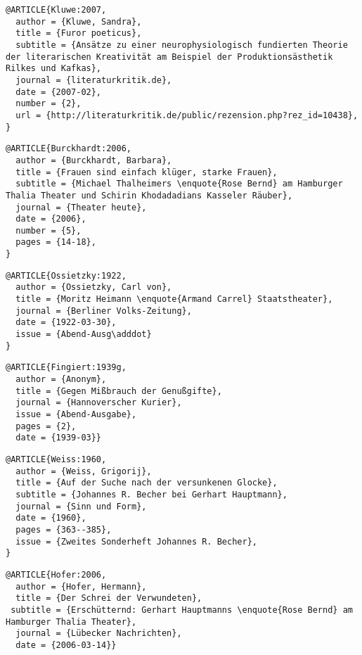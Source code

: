 \documentclass[english]{scrartcl}
\begin{document}
\begin{lstlisting}
@ARTICLE{Kluwe:2007,
  author = {Kluwe, Sandra},
  title = {Furor poeticus},
  subtitle = {Ansätze zu einer neurophysiologisch fundierten Theorie der literarischen Kreativität am Beispiel der Produktionsästhetik Rilkes und Kafkas},
  journal = {literaturkritik.de},
  date = {2007-02},
  number = {2},
  url = {http://literaturkritik.de/public/rezension.php?rez_id=10438},
}
\end{lstlisting}

\begin{lstlisting}
@ARTICLE{Burckhardt:2006,
  author = {Burckhardt, Barbara},
  title = {Frauen sind einfach klüger, starke Frauen},
  subtitle = {Michael Thalheimers \enquote{Rose	Bernd} am Hamburger Thalia Theater und Schirin Khodadadians Kasseler Räuber},
  journal = {Theater heute},
  date = {2006},
  number = {5},
  pages = {14-18},
}
\end{lstlisting}
\foreignlanguage{german}{}

\begin{lstlisting}
@ARTICLE{Ossietzky:1922,
  author = {Ossietzky, Carl von},
  title = {Moritz Heimann \enquote{Armand Carrel} Staatstheater},
  journal = {Berliner Volks-Zeitung},
  date = {1922-03-30},
  issue = {Abend-Ausg\adddot}
}
\end{lstlisting}

\begin{lstlisting}
@ARTICLE{Fingiert:1939g,
  author = {Anonym},
  title = {Gegen Mißbrauch der Genußgifte},
  journal = {Hannoverscher Kurier},
  issue = {Abend-Ausgabe},
  pages = {2},
  date = {1939-03}}
\end{lstlisting}

\begin{lstlisting}
@ARTICLE{Weiss:1960,
  author = {Weiss, Grigorij},
  title = {Auf der Suche nach der versunkenen Glocke},
  subtitle = {Johannes R. Becher bei Gerhart Hauptmann},
  journal = {Sinn und Form},
  date = {1960},
  pages = {363--385},
  issue = {Zweites Sonderheft Johannes R. Becher},
}
\end{lstlisting}

\begin{lstlisting}
@ARTICLE{Hofer:2006,
  author = {Hofer, Hermann},
  title = {Der Schrei der Verwundeten},
 subtitle = {Erschütternd: Gerhart Hauptmanns \enquote{Rose Bernd} am Hamburger Thalia Theater},
  journal = {Lübecker Nachrichten},
  date = {2006-03-14}}
\end{lstlisting}
\end{document}
